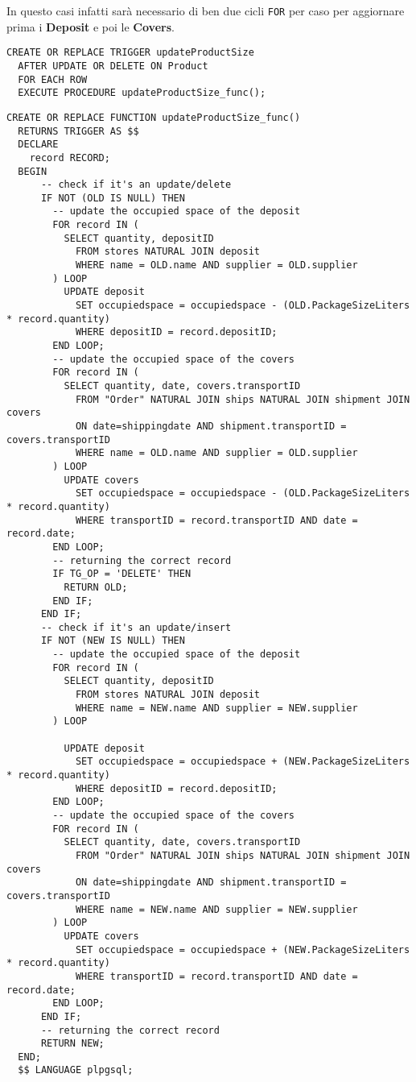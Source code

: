 In questo casi infatti sarà necessario di ben due cicli \lstinline{FOR} per caso per aggiornare prima i \textbf{Deposit} e poi le \textbf{Covers}.

\begin{lstlisting}[caption={Trigger per implementare \textbf{updateProductSize}}]
  CREATE OR REPLACE TRIGGER updateProductSize
  AFTER UPDATE OR DELETE ON Product
  FOR EACH ROW
  EXECUTE PROCEDURE updateProductSize_func();
\end{lstlisting}

\begin{lstlisting}[caption={Funzione \textbf{updateProductSize}}]
  CREATE OR REPLACE FUNCTION updateProductSize_func()
  RETURNS TRIGGER AS $$
  DECLARE
    record RECORD;
  BEGIN
      -- check if it's an update/delete
      IF NOT (OLD IS NULL) THEN
        -- update the occupied space of the deposit
        FOR record IN (
          SELECT quantity, depositID
            FROM stores NATURAL JOIN deposit
            WHERE name = OLD.name AND supplier = OLD.supplier
        ) LOOP
          UPDATE deposit
            SET occupiedspace = occupiedspace - (OLD.PackageSizeLiters * record.quantity)
            WHERE depositID = record.depositID;
        END LOOP;
        -- update the occupied space of the covers
        FOR record IN (
          SELECT quantity, date, covers.transportID
            FROM "Order" NATURAL JOIN ships NATURAL JOIN shipment JOIN covers
            ON date=shippingdate AND shipment.transportID = covers.transportID
            WHERE name = OLD.name AND supplier = OLD.supplier
        ) LOOP
          UPDATE covers
            SET occupiedspace = occupiedspace - (OLD.PackageSizeLiters * record.quantity)
            WHERE transportID = record.transportID AND date = record.date;
        END LOOP;
        -- returning the correct record
        IF TG_OP = 'DELETE' THEN
          RETURN OLD;
        END IF;
      END IF;
      -- check if it's an update/insert
      IF NOT (NEW IS NULL) THEN
        -- update the occupied space of the deposit
        FOR record IN (
          SELECT quantity, depositID
            FROM stores NATURAL JOIN deposit
            WHERE name = NEW.name AND supplier = NEW.supplier
        ) LOOP
    
          UPDATE deposit
            SET occupiedspace = occupiedspace + (NEW.PackageSizeLiters * record.quantity)
            WHERE depositID = record.depositID;
        END LOOP;
        -- update the occupied space of the covers
        FOR record IN (
          SELECT quantity, date, covers.transportID
            FROM "Order" NATURAL JOIN ships NATURAL JOIN shipment JOIN covers
            ON date=shippingdate AND shipment.transportID = covers.transportID
            WHERE name = NEW.name AND supplier = NEW.supplier
        ) LOOP
          UPDATE covers
            SET occupiedspace = occupiedspace + (NEW.PackageSizeLiters * record.quantity)
            WHERE transportID = record.transportID AND date = record.date;
        END LOOP;
      END IF;
      -- returning the correct record
      RETURN NEW;
  END;
  $$ LANGUAGE plpgsql;
\end{lstlisting}

